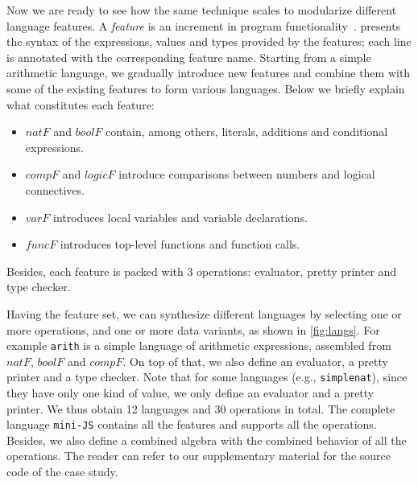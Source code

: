Now we are ready to see how the same technique scales to modularize different
language features. A \emph{feature} is an increment in program
functionality~\cite{zave1999faq,lopez2005evaluating}. 
presents the syntax of the expressions, values and types provided by the
features; each line is annotated with the corresponding feature name. Starting from a
simple arithmetic language, we gradually introduce new features and combine them
with some of the existing features to form various languages. Below we briefly
explain what constitutes each feature:
\begin{itemize}
\item $\mathit{natF}$ and $\mathit{boolF}$ contain, among others, literals, additions and conditional expressions.
\item $\mathit{compF}$ and $\mathit{logicF}$ introduce comparisons between numbers and logical connectives.
\item $\mathit{varF}$ introduces local variables and variable declarations.
\item $\mathit{funcF}$ introduces top-level functions and function calls.
\end{itemize}
Besides, each feature is packed with 3 operations: evaluator, pretty
printer and type checker.

Having the feature set, we can synthesize different languages by selecting one
or more operations, and one or more data variants, as shown in \cref{fig:langs}.
For example \lstinline{arith} is a simple language of arithmetic expressions,
assembled from $\mathit{natF}$, $\mathit{boolF}$ and $\mathit{compF}$. On top of
that, we also define an evaluator, a pretty printer and a type checker. Note
that for some languages (e.g., \lstinline{simplenat}), since they have only one
kind of value, we only define an evaluator and a pretty printer. We thus obtain
12 languages and 30 operations in total. The complete language
\lstinline{mini-JS} contains all the features and supports all the operations.
Besides, we also define a combined algebra with the combined behavior of all the operations.
The reader can refer to our supplementary material for the source code of the case study.


